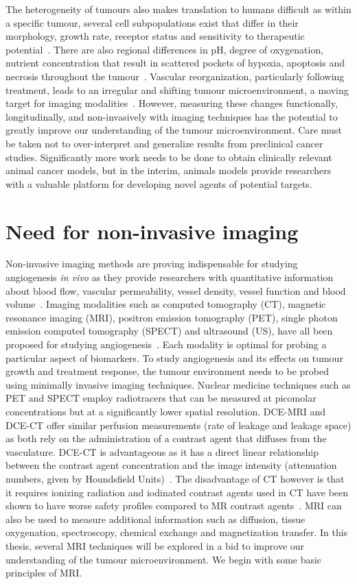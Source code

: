 The heterogeneity of tumours also makes translation to humans difficult as within a specific tumour, several cell subpopulations exist that differ in their morphology, growth rate, receptor status and sensitivity to therapeutic potential~\cite{Hayes:2002ta,Heppner:1984ve}.
There are also regional differences in pH, degree of oxygenation, nutrient concentration that result in scattered pockets of hypoxia, apoptosis and necrosis  throughout the tumour~\cite{Hayes:2002ta, Jackson:2007uh,Heppner:1984ve}.
Vascular reorganization, particularly following treatment\cite{Wachsberger:2003vr,Kanthou:2002to}, leads to an irregular and shifting tumour microenvironment, a moving target for imaging modalities~\cite{Laking:2006ij}.
However, measuring these changes functionally, longitudinally, and non-invasively with imaging techniques has the potential to greatly improve our understanding of the tumour microenvironment.
Care must be taken not to over-interpret and generalize results from preclinical cancer studies.
Significantly more work needs to be done to obtain clinically relevant animal cancer models, but in the interim, animals models provide researchers with a valuable platform for developing novel agents of potential targets.

\section{Need for non-invasive imaging}
Non-invasive imaging methods are proving indispensable for studying angiogenesis \emph{in vivo} as they provide researchers with quantitative information about blood flow, vascular permeability, vessel density, vessel function and blood volume~\cite{McDonald:2003cm}.
Imaging modalities such as computed tomography (CT), magnetic resonance imaging (MRI), positron emission tomography (PET), single photon emission computed tomography (SPECT) and ultrasound (US), have all been proposed for studying angiogenesis~\cite{Laking:2006ij}.
Each modality is optimal for probing a particular aspect of biomarkers. 
To study angiogenesis and its effects on tumour growth and treatment response, the tumour environment needs to be probed using minimally invasive imaging techniques. 
Nuclear medicine techniques such as PET and SPECT employ radiotracers that can be measured at picomolar concentrations but at a significantly lower spatial resolution.
DCE-MRI and DCE-CT offer similar perfusion measurements (rate of leakage and leakage space) as both rely on the administration of a contrast agent that diffuses from the vasculature.
DCE-CT is advantageous as it has a direct linear relationship between the contrast agent concentration and the image intensity (attenuation numbers, given by Houndsfield Units)~\cite{Cuenod:2006jy}.
The disadvantage of CT however is that it requires ionizing radiation and iodinated contrast agents used in CT have been shown to have worse safety profiles compared to MR contrast agents~\cite{Hasebroock:2009hw}.
MRI can also be used to measure additional information such as diffusion, tissue oxygenation, spectroscopy, chemical exchange and magnetization transfer. 
In this thesis, several MRI techniques will be explored in a bid to improve our understanding of the tumour microenvironment.
We begin with some basic principles of MRI.

